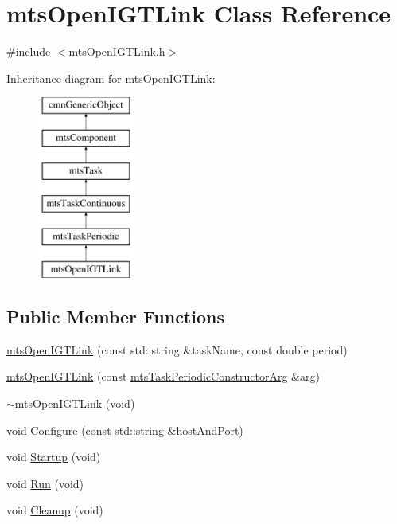 \hypertarget{classmts_open_i_g_t_link}{\section{mts\-Open\-I\-G\-T\-Link Class Reference}
\label{classmts_open_i_g_t_link}
}


{\ttfamily \#include $<$mts\-Open\-I\-G\-T\-Link.\-h$>$}

Inheritance diagram for mts\-Open\-I\-G\-T\-Link\-:\begin{figure}[H]
\begin{center}
\leavevmode
\includegraphics[height=6.000000cm]{d4/d9e/classmts_open_i_g_t_link}
\end{center}
\end{figure}
\subsection*{Public Member Functions}
\begin{DoxyCompactItemize}
\item 
\hyperlink{classmts_open_i_g_t_link_a19999bf32cb5e8fda9a5ee16ef540424}{mts\-Open\-I\-G\-T\-Link} (const std\-::string \&task\-Name, const double period)
\item 
\hyperlink{classmts_open_i_g_t_link_a1b81ba9af63a60d2ac9fabfa8250f7fc}{mts\-Open\-I\-G\-T\-Link} (const \hyperlink{classmts_task_periodic_constructor_arg}{mts\-Task\-Periodic\-Constructor\-Arg} \&arg)
\item 
\hyperlink{classmts_open_i_g_t_link_abded02f25c22dccdcbd4b65f7902d88f}{$\sim$mts\-Open\-I\-G\-T\-Link} (void)
\item 
void \hyperlink{classmts_open_i_g_t_link_a10a224364ae3264d636b8a4a6ca6885e}{Configure} (const std\-::string \&host\-And\-Port)
\item 
void \hyperlink{classmts_open_i_g_t_link_a4eac46872e057369d46a21b1ea596acf}{Startup} (void)
\item 
void \hyperlink{classmts_open_i_g_t_link_a5bffb1931626355ec81281d953e1df55}{Run} (void)
\item 
void \hyperlink{classmts_open_i_g_t_link_a4b86831090e4b0ec3b73beedfc570ac7}{Cleanup} (void)
\end{DoxyCompactItemize}
